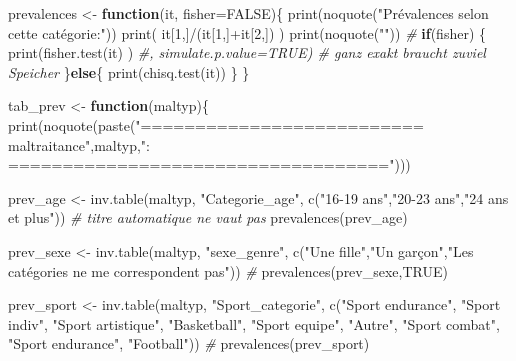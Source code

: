 \documentclass[
]{article}
\newenvironment{Shaded}{\begin{snugshade}}{\end{snugshade}}
\newcommand{\AttributeTok}[1]{\textcolor[rgb]{0.77,0.63,0.00}{#1}}
\newcommand{\CommentTok}[1]{\textcolor[rgb]{0.56,0.35,0.01}{\textit{#1}}}
\newcommand{\ConstantTok}[1]{\textcolor[rgb]{0.00,0.00,0.00}{#1}}
\newcommand{\ControlFlowTok}[1]{\textcolor[rgb]{0.13,0.29,0.53}{\textbf{#1}}}
\newcommand{\DecValTok}[1]{\textcolor[rgb]{0.00,0.00,0.81}{#1}}
\newcommand{\FunctionTok}[1]{\textcolor[rgb]{0.00,0.00,0.00}{#1}}
\newcommand{\NormalTok}[1]{#1}
\newcommand{\OtherTok}[1]{\textcolor[rgb]{0.56,0.35,0.01}{#1}}
\newcommand{\SpecialCharTok}[1]{\textcolor[rgb]{0.00,0.00,0.00}{#1}}
\newcommand{\StringTok}[1]{\textcolor[rgb]{0.31,0.60,0.02}{#1}}
\begin{document}
\begin{Shaded}
\begin{Highlighting}[]
\NormalTok{prevalences }\OtherTok{\textless{}{-}} \ControlFlowTok{function}\NormalTok{(it, }\AttributeTok{fisher=}\ConstantTok{FALSE}\NormalTok{)\{}
  \FunctionTok{print}\NormalTok{(}\FunctionTok{noquote}\NormalTok{(}\StringTok{"Prévalences selon cette catégorie:"}\NormalTok{))}
  \FunctionTok{print}\NormalTok{( it[}\DecValTok{1}\NormalTok{,]}\SpecialCharTok{/}\NormalTok{(it[}\DecValTok{1}\NormalTok{,]}\SpecialCharTok{+}\NormalTok{it[}\DecValTok{2}\NormalTok{,]) )}
  \FunctionTok{print}\NormalTok{(}\FunctionTok{noquote}\NormalTok{(}\StringTok{""}\NormalTok{))}
  \CommentTok{\#}
  \ControlFlowTok{if}\NormalTok{(fisher) \{}
    \FunctionTok{print}\NormalTok{(}\FunctionTok{fisher.test}\NormalTok{(it) )   }\CommentTok{\#, simulate.p.value=TRUE)  \# ganz exakt braucht zuviel Speicher}
\NormalTok{  \}}\ControlFlowTok{else}\NormalTok{\{}
    \FunctionTok{print}\NormalTok{(}\FunctionTok{chisq.test}\NormalTok{(it))}
\NormalTok{  \}}
\NormalTok{\}}

\NormalTok{tab\_prev }\OtherTok{\textless{}{-}} \ControlFlowTok{function}\NormalTok{(maltyp)\{}
  \FunctionTok{print}\NormalTok{(}\FunctionTok{noquote}\NormalTok{(}\FunctionTok{paste}\NormalTok{(}\StringTok{"========================== maltraitance"}\NormalTok{,maltyp,}\StringTok{": ==================================="}\NormalTok{)))}
  
\NormalTok{  prev\_age }\OtherTok{\textless{}{-}} \FunctionTok{inv.table}\NormalTok{(maltyp, }\StringTok{"Categorie\_age"}\NormalTok{, }\FunctionTok{c}\NormalTok{(}\StringTok{"16{-}19 ans"}\NormalTok{,}\StringTok{"20{-}23 ans"}\NormalTok{,}\StringTok{"24 ans et plus"}\NormalTok{))         }\CommentTok{\# titre automatique ne vaut pas}
  \FunctionTok{prevalences}\NormalTok{(prev\_age)}

\NormalTok{  prev\_sexe }\OtherTok{\textless{}{-}} \FunctionTok{inv.table}\NormalTok{(maltyp, }\StringTok{"sexe\_genre"}\NormalTok{, }\FunctionTok{c}\NormalTok{(}\StringTok{"Une fille"}\NormalTok{,}\StringTok{"Un garçon"}\NormalTok{,}\StringTok{"Les catégories ne me correspondent pas"}\NormalTok{))   }\CommentTok{\# }
  \FunctionTok{prevalences}\NormalTok{(prev\_sexe,}\ConstantTok{TRUE}\NormalTok{)}

\NormalTok{  prev\_sport }\OtherTok{\textless{}{-}} \FunctionTok{inv.table}\NormalTok{(maltyp, }\StringTok{"Sport\_categorie"}\NormalTok{, }\FunctionTok{c}\NormalTok{(}\StringTok{"Sport endurance"}\NormalTok{, }\StringTok{"Sport indiv"}\NormalTok{, }\StringTok{"Sport artistique"}\NormalTok{, }\StringTok{"Basketball"}\NormalTok{, }\StringTok{"Sport equipe"}\NormalTok{, }\StringTok{"Autre"}\NormalTok{, }\StringTok{"Sport combat"}\NormalTok{, }\StringTok{"Sport endurance"}\NormalTok{, }\StringTok{"Football"}\NormalTok{))   }\CommentTok{\# }
  \FunctionTok{prevalences}\NormalTok{(prev\_sport)}


\end{Highlighting}
\end{Shaded}
\end{document}
